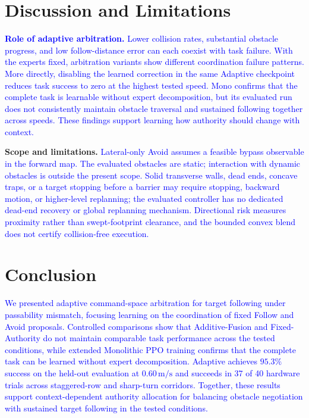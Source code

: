 \documentclass[letterpaper, 10 pt, conference]{ieeeconf}
\newcommand{\rev}[1]{\textcolor{blue}{#1}}
\begin{document}
\section{Discussion and Limitations}
\rev{\textbf{Role of adaptive arbitration.}} \rev{Lower collision rates, substantial obstacle progress, and low follow-distance error can each coexist with task failure. With the experts fixed, arbitration variants show different coordination failure patterns. More directly, disabling the learned correction in the same Adaptive checkpoint reduces task success to zero at the highest tested speed. Mono confirms that the complete task is learnable without expert decomposition, but its evaluated run does not consistently maintain obstacle traversal and sustained following together across speeds. These findings support learning how authority should change with context.}

\textbf{Scope and limitations.} \rev{Lateral-only Avoid assumes a feasible bypass observable in the forward map. The evaluated obstacles are static; interaction with dynamic obstacles is outside the present scope. Solid transverse walls, dead ends, concave traps, or a target stopping before a barrier may require stopping, backward motion, or higher-level replanning; the evaluated controller has no dedicated dead-end recovery or global replanning mechanism. Directional risk measures proximity rather than swept-footprint clearance, and the bounded convex blend does not certify collision-free execution.}

\section{Conclusion}
\rev{We presented adaptive command-space arbitration for target following under passability mismatch, focusing learning on the coordination of fixed Follow and Avoid proposals. Controlled comparisons show that Additive-Fusion and Fixed-Authority do not maintain comparable task performance across the tested conditions, while extended Monolithic PPO training confirms that the complete task can be learned without expert decomposition. Adaptive achieves $95.3\%$ success on the held-out evaluation at $0.60\,\mathrm{m/s}$ and succeeds in 37 of 40 hardware trials across staggered-row and sharp-turn corridors. Together, these results support context-dependent authority allocation for balancing obstacle negotiation with sustained target following in the tested conditions.}
\end{document}
